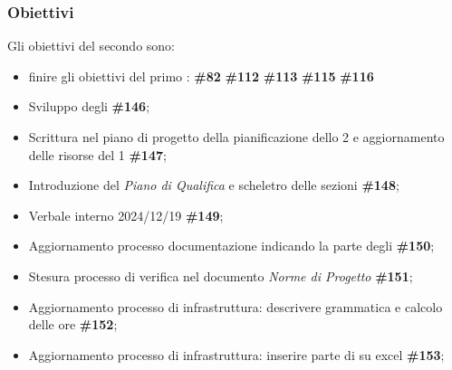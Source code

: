 \subsubsection{Obiettivi}

Gli obiettivi del secondo  sono:
\begin{itemize}
    \item finire gli obiettivi del primo : \textbf{\#82} \textbf{\#112} \textbf{\#113} \textbf{\#115} \textbf{\#116}
    \item Sviluppo degli  \textbf{\#146};
    \item Scrittura nel piano di progetto della pianificazione dello  2 e aggiornamento delle risorse del  1 \textbf{\#147};
    \item Introduzione del \textit{Piano di Qualifica} e scheletro delle sezioni \textbf{\#148};
    \item Verbale interno 2024/12/19 \textbf{\#149};
    \item Aggiornamento processo documentazione indicando la parte degli  \textbf{\#150};
    \item Stesura processo di verifica nel documento \textit{Norme di Progetto} \textbf{\#151};
    \item Aggiornamento processo di infrastruttura: descrivere  grammatica e calcolo delle ore \textbf{\#152};
    \item Aggiornamento processo di infrastruttura: inserire parte di  su excel \textbf{\#153};
\end{itemize}